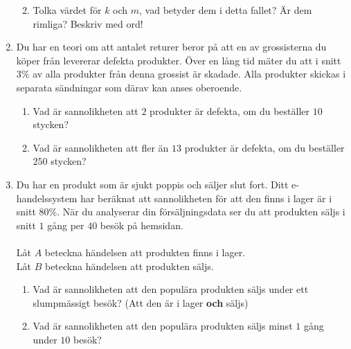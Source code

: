 \documentclass[a4paper,10pt]{article}
\begin{document}
\begin{enumerate}
\begin{enumerate}
        \newpage
        \item{Tolka värdet för $k$ och $m$, vad betyder dem i detta fallet? Är dem rimliga? Beskriv med ord!}
    \end{enumerate}
    \newpage
    \item{Du har en teori om att antalet returer beror på att en av grossisterna du köper från levererar defekta produkter. Över en lång tid mäter du att i snitt $3\%$ av alla produkter från denna grossist är skadade. Alla produkter skickas i separata sändningar som därav kan anses oberoende.}
    \begin{enumerate}
        \item{Vad är sannolikheten att $2$ produkter är defekta, om du beställer $10$ stycken?}
        \newpage
        \item{Vad är sannolikheten att fler än $13$ produkter är defekta, om du beställer $250$ stycken?}
    \end{enumerate}
    \newpage
    \item{Du har en produkt som är sjukt poppis och säljer slut fort. Ditt e-handelssystem har beräknat att sannolikheten för att den finns i lager är i snitt $80\%$. När du analyserar din försäljningsdata ser du att produkten säljs i snitt $1$ gång per $40$ besök på hemsidan.\\
  \\
  Låt $A$ beteckna händelsen att produkten finns i lager.\\
  Låt $B$ beteckna händelsen att produkten säljs.}
    \begin{enumerate}
        \item{Vad är sannolikheten att den populära produkten säljs under ett slumpmässigt besök? (Att den är i lager {\bf och} säljs)}
        \newpage
        \item{Vad är sannolikheten att den populära produkten säljs minst $1$ gång under $10$ besök?}
    \end{enumerate}
\end{enumerate}
\end{document}
